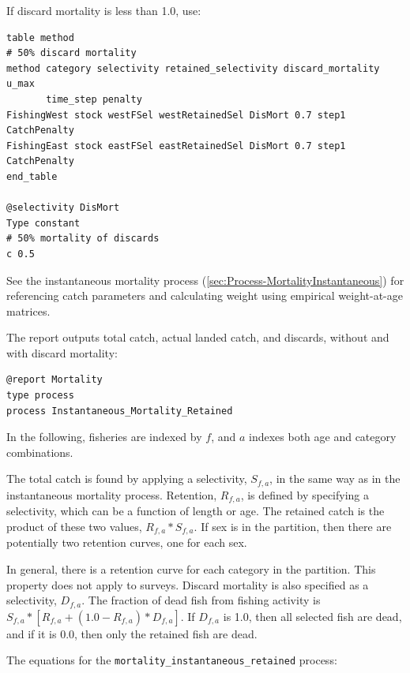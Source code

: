 If discard mortality is less than 1.0, use:

{\small{\begin{verbatim}
table method
# 50% discard mortality
method category selectivity retained_selectivity discard_mortality u_max 
       time_step penalty
FishingWest stock westFSel westRetainedSel DisMort 0.7 step1 CatchPenalty
FishingEast stock eastFSel eastRetainedSel DisMort 0.7 step1 CatchPenalty
end_table

@selectivity DisMort
Type constant
# 50% mortality of discards
c 0.5
\end{verbatim}}}

See the instantaneous mortality process (\ref{sec:Process-MortalityInstantaneous}) for referencing catch parameters and calculating weight using empirical weight-at-age matrices.

The report outputs total catch, actual landed catch, and discards, without and with discard mortality:

{\small{\begin{verbatim}
@report Mortality
type process
process Instantaneous_Mortality_Retained
\end{verbatim}}}


In the following, fisheries are indexed by $f$, and $a$ indexes both age and category combinations.

The total catch is found by applying a selectivity, $S_{f,a}$, in the same way as in the instantaneous mortality process. Retention, $R_{f,a}$, is defined by specifying a selectivity, which can be a function of length or age. The retained catch is the product of these two values, $R_{f,a} * S_{f,a}$. If sex is in the partition, then there are potentially two retention curves, one for each sex.

In general, there is a retention curve for each category in the partition. This property does not apply to surveys. Discard mortality is also specified as a selectivity, $D_{f,a}$. The fraction of dead fish from fishing activity is $S_{f,a} * [ R_{f,a} + (1.0 - R_{f,a}) * D_{f,a} ]$. If $D_{f,a}$ is 1.0, then all selected fish are dead, and if it is 0.0, then only the retained fish are dead.

The equations for the \texttt{mortality\_instantaneous\_retained} process:

